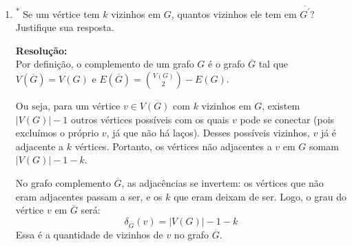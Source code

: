 \begin{enumerate}[label=\textbf{\arabic*.}, ref=\arabic*]
    \vspace{0.3cm}
    \noindent \textbf{ii) Por matriz de adjacência:}\\
    Usando a representação por matriz de adjacência $M$ de dimensão $n \times n$ para um grafo completo, todos os valores fora da diagonal principal devem ser iguais a $1$, e os elementos da diagonal principal iguais a $0$ (já que não há laços).
    \[
    M = \begin{bmatrix}
    0 & 1 & 1 & \cdots & 1 \\
    1 & 0 & 1 & \cdots & 1 \\
    1 & 1 & 0 & \cdots & 1 \\
    \vdots & \vdots & \vdots & \ddots & \vdots \\
    1 & 1 & 1 & \cdots & 0
    \end{bmatrix}_{n \times n}
    \]
    Pelo Teorema 3, sabemos que a soma dos graus de todos os vértices de um grafo é o dobro do número de arestas:
    \[
    \sum_{v \in V(G)} \delta_G(v) = 2|E(G)|
    \]
    A soma dos graus corresponde à soma de todos os elementos da matriz de adjacência. Como a matriz possui $n \times n = n^2$ elementos no total e $n$ zeros na diagonal principal, a soma de todos os elementos é $n^2 - n$. Logo:
    \[
    2|E(G)| = n^2 - n \implies |E(G)| = \frac{n^2 - n}{2} = \frac{n(n-1)}{2}
    \]
    
    \item\textsuperscript{*} Se um vértice tem $k$ vizinhos em $G$, quantos vizinhos ele tem em $\overline{G^{\prime}}$? Justifique sua resposta. 

    \noindent \textbf{Resolução:}\\
    Por definição, o complemento de um grafo $G$ é o grafo $\overline{G}$ tal que $V(\overline{G}) = V(G)$ e $E(\overline{G}) = \binom{V(G)}{2} - E(G)$.
    
    Ou seja, para um vértice $v \in V(G)$ com $k$ vizinhos em $G$, existem $|V(G)| - 1$ outros vértices possíveis com os quais $v$ pode se conectar (pois excluímos o próprio $v$, já que não há laços). Desses possíveis vizinhos, $v$ já é adjacente a $k$ vértices. Portanto, os vértices não adjacentes a $v$ em $G$ somam $|V(G)| - 1 - k$.
    
    No grafo complemento $\overline{G}$, as adjacências se invertem: os vértices que não eram adjacentes passam a ser, e os $k$ que eram deixam de ser. Logo, o grau do vértice $v$ em $\overline{G}$ será:
    \[
    \delta_{\overline{G}}(v) = |V(G)| - 1 - k
    \]
    Essa é a quantidade de vizinhos de $v$ no grafo $\overline{G}$.


\end{enumerate}
